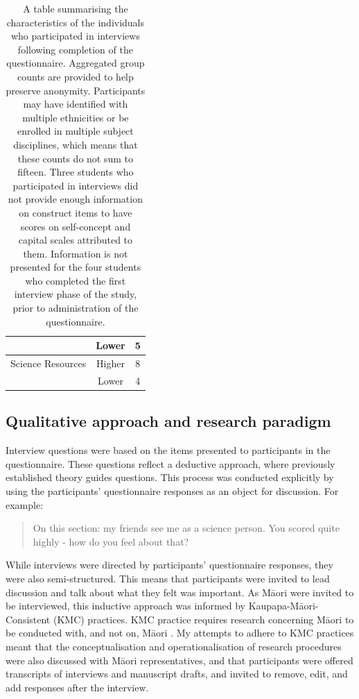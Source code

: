 \begin{table}[ht]
\begin{tabular}{cc|c}
                       & Lower                    & 5     \\ \hline
Science Resources      & Higher                   & 8     \\
                       & Lower                    & 4    
\end{tabular}
\caption{\label{tab:Demographics} A table summarising the characteristics of the individuals who participated in interviews following completion of the questionnaire. Aggregated group counts are provided to help preserve anonymity. Participants may have identified with multiple ethnicities or be enrolled in multiple subject disciplines, which means that these counts do not sum to fifteen. Three students who participated in interviews did not provide enough information on construct items to have scores on self-concept and capital scales attributed to them. Information is not presented for the four students who completed the first interview phase of the study, prior to administration of the questionnaire.}
\end{table}

\subsection{Qualitative approach and research paradigm}
Interview questions were based on the items presented to participants in the questionnaire. These questions reflect a deductive approach, where previously established theory guides questions. This process was conducted explicitly by using the participants' questionnaire responses as an object for discussion. For example: 
\blockquote{On this section: my friends see me as a science person. You scored quite highly - how do you feel about that?} While interviews were directed by participants' questionnaire responses, they were also semi-structured. This means that participants were invited to lead discussion and talk about what they felt was important. As M\={a}ori were invited to be interviewed, this inductive approach was informed by Kaupapa-M\={a}ori-Consistent (KMC) practices. KMC practice requires research concerning M\={a}ori to be conducted with, and not on, M\={a}ori \citep{walker2006exploration}. My attempts to adhere to KMC practices meant that the conceptualisation and operationalisation of research procedures were also discussed with M\={a}ori representatives, and that participants were offered transcripts of interviews and manuscript drafts, and invited to remove, edit, and add responses after the interview.  

